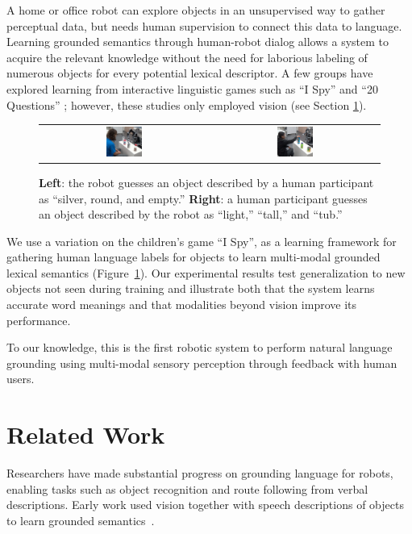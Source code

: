 \documentclass{article}
\newcommand{\ispy}{``I Spy''\xspace}
\begin{document}
A home or office robot can explore objects in an unsupervised way to gather perceptual data, but needs human supervision to connect this data to language.
Learning grounded semantics through human-robot dialog allows a system to acquire the relevant knowledge without the need for laborious labeling of numerous objects for every potential lexical descriptor.
A few groups have explored learning from interactive linguistic games such as \ispy and ``20 Questions'' \cite{parde:ijcai15,vogel:aaai10}; however, these studies only employed vision (see Section \ref{sec:relatedwork}).

\begin{figure}
\centering
\begin{tabular}{cc}
	\includegraphics[width=0.225\textwidth]{figures/silver_round_and_empty_cropped.png} &
	\includegraphics[width=0.225\textwidth]{figures/light_tall_tub_cropped.jpg} \\
\end{tabular}
\caption{\textbf{Left}: the robot guesses an object described by a human participant as ``silver, round, and empty.'' \textbf{Right}: a human participant guesses an object described by the robot as ``light,'' ``tall,'' and ``tub.''}
\label{fig:ispy}
\end{figure}

We use a variation on the children's game \ispy, as a learning framework for gathering human language labels for objects to learn multi-modal grounded lexical semantics (Figure~\ref{fig:ispy}).
Our experimental results test generalization to new objects not seen during training and illustrate both that the system learns accurate word meanings and that modalities beyond vision improve its performance.

To our knowledge, this is the first robotic system to perform natural language grounding using multi-modal sensory perception through feedback with human users.

\section{Related Work}
\label{sec:relatedwork}
Researchers have made substantial progress on grounding language for robots, enabling tasks such as object recognition and route following from verbal descriptions.
Early work used vision together with speech descriptions of objects to learn grounded semantics~\cite{roy:cogsci02}.
\end{document}
